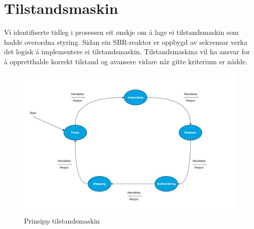 \section{Tilstandsmaskin}
\thispagestyle{fancy}

Vi identifiserte tidleg i prosessen eit ønskje om å lage ei tilstandsmaskin som hadde overordna styring. 
Sidan ein \gls{SBR}-reaktor er oppbygd av sekvensar verka det logisk å implementere ei tilstandsmaskin.
Tilstandsmaskina vil ha ansvar for å oppretthalde korrekt tilstand og avansere vidare når gitte kriterium er nådde. \newline \newline \newline

\begin{figure}[htbp]
    \centering
    \includegraphics[width=1\textwidth]{Figurar/Tom tilstandsmaskin.png}
    \caption{Prinsipp tilstandsmaskin }\label{fig:Tilstandsmaskin prinsipp}    
\end{figure}

\newpage

